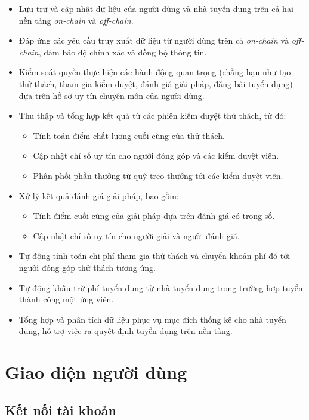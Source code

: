 \begin{itemize}
  \item Lưu trữ và cập nhật dữ liệu của người dùng và nhà tuyển dụng trên cả hai nền tảng \textit{on-chain} và \textit{off-chain}.
  \item Đáp ứng các yêu cầu truy xuất dữ liệu từ người dùng trên cả \textit{on-chain} và \textit{off-chain}, đảm bảo độ chính xác và đồng bộ thông tin.
  \item Kiểm soát quyền thực hiện các hành động quan trọng (chẳng hạn như tạo thử thách, tham gia kiểm duyệt, đánh giá giải pháp, đăng bài tuyển dụng) dựa trên hồ sơ uy tín chuyên môn của người dùng.
  \item Thu thập và tổng hợp kết quả từ các phiên kiểm duyệt thử thách, từ đó:
    \begin{itemize}
      \item Tính toán điểm chất lượng cuối cùng của thử thách.
      \item Cập nhật chỉ số uy tín cho người đóng góp và các kiểm duyệt viên.
      \item Phân phối phần thưởng từ quỹ treo thưởng tới các kiểm duyệt viên.
    \end{itemize}
  \item Xử lý kết quả đánh giá giải pháp, bao gồm:
    \begin{itemize}
      \item Tính điểm cuối cùng của giải pháp dựa trên đánh giá có trọng số.
      \item Cập nhật chỉ số uy tín cho người giải và người đánh giá.
    \end{itemize}
  \item Tự động tính toán chi phí tham gia thử thách và chuyển khoản phí đó tới người đóng góp thử thách tương ứng.
  \item Tự động khấu trừ phí tuyển dụng từ nhà tuyển dụng trong trường hợp tuyển thành công một ứng viên.
  \item Tổng hợp và phân tích dữ liệu phục vụ mục đích thống kê cho nhà tuyển dụng, hỗ trợ việc ra quyết định tuyển dụng trên nền tảng.
\end{itemize}

\section{Giao diện người dùng}

\subsection{Kết nối tài khoản}

